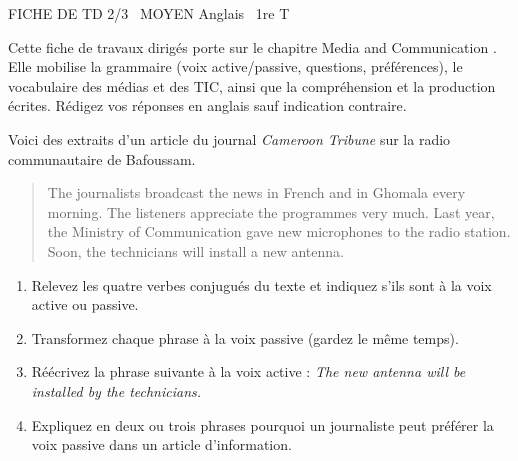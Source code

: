 \documentclass[11pt]{article}
\begin{document}
\begin{tcolorbox}[enhanced,colback=popink,colframe=popink,arc=10pt,boxrule=0pt,left=12pt,right=12pt,top=9pt,bottom=9pt]
{\color{white}\popxbold\small FICHE DE TD 2/3 \textbullet\ MOYEN \hfill Anglais \textbullet\ 1re T\par}
\end{tcolorbox}
\vspace{4pt}
Cette fiche de travaux dirigés porte sur le chapitre \og Media and Communication \fg{}. Elle mobilise la grammaire (voix active/passive, questions, préférences), le vocabulaire des médias et des TIC, ainsi que la compréhension et la production écrites. Rédigez vos réponses en anglais sauf indication contraire.

\begin{exercice}
Voici des extraits d'un article du journal \emph{Cameroon Tribune} sur la radio communautaire de Bafoussam.
\begin{quote}
\og The journalists broadcast the news in French and in Ghomala every morning. The listeners appreciate the programmes very much. Last year, the Ministry of Communication gave new microphones to the radio station. Soon, the technicians will install a new antenna. \fg{}
\end{quote}
\begin{enumerate}
\item Relevez les quatre verbes conjugués du texte et indiquez s'ils sont à la voix active ou passive.
\item Transformez chaque phrase à la voix passive (gardez le même temps).
\item Réécrivez la phrase suivante à la voix active : \emph{The new antenna will be installed by the technicians.}
\item Expliquez en deux ou trois phrases pourquoi un journaliste peut préférer la voix passive dans un article d'information.
\end{enumerate}
\end{exercice}
\end{document}
